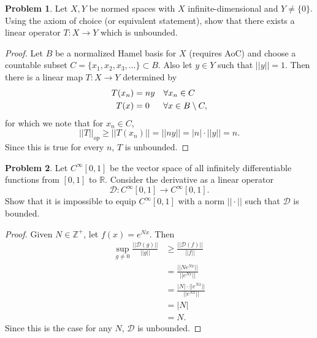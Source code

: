 \documentclass[12pt]{article}
\theoremstyle{definition}
\newtheorem{ex}{Problem}
\begin{document}
\begin{ex}
	Let $X, Y$ be normed spaces with $X$ infinite-dimensional and $Y \neq \lbrace 0 \rbrace$.
	Using the axiom of choice (or equivalent statement), show that there exists a linear operator $T : X \to Y$ which is unbounded.
\end{ex}
\begin{proof}
	Let $B$ be a normalized Hamel basis for $X$ (requires AoC) and choose a countable subset $C = \lbrace x_1, x_2, x_3, \dots \rbrace \subset B$.
	Also let $y \in Y$ such that $||y|| = 1$.
	Then there is a linear map $T : X \to Y$ determined by \begin{align*}
		T(x_n) & = ny \hspace{1em} \forall x_n \in C              \\
		T(x)   & = 0 \hspace{1.61em} \forall x \in B \setminus C,
	\end{align*}
	for which we note that for $x_n \in C$, \begin{equation*}
		||T||_{op} \geq ||T(x_n)|| = ||ny|| = |n| \cdot ||y|| = n.
	\end{equation*}
	Since this is true for every $n$, $T$ is unbounded.
\end{proof}

\begin{ex}
	Let $C^\infty[0, 1]$ be the vector space of all infinitely differentiable functions from $[0, 1]$ to $\mathbb{R}$.
	Consider the derivative as a linear operator \begin{equation*}
		\mathcal{D} : C^\infty[0, 1] \to C^\infty [0, 1].
	\end{equation*}
	Show that it is impossible to equip $C^\infty[0, 1]$ with a norm $||\cdot||$ such that $\mathcal{D}$ is bounded.
\end{ex}
\begin{proof}
	Given $N \in \mathbb{Z}^+$, let $f(x) = e^{Nx}$.
	Then \begin{align*}
		\sup_{g \neq 0} \frac{||\mathcal{D}(g)||}{||g||} & \geq \frac{||\mathcal{D}(f)||}{||f||}     \\
		                                                 & = \frac{||Ne^{Nx}||}{||e^{Nx}||}          \\
		                                                 & = \frac{|N| \cdot ||e^{Nx}||}{||e^{Nx}||} \\
		                                                 & = |N|                                     \\
		                                                 & = N.
	\end{align*}
	Since this is the case for any $N$, $\mathcal{D}$ is unbounded.
\end{proof}
\end{document}

